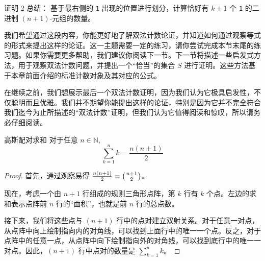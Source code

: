 \begin{questions}{证明 2 总结：}
    基于最右侧的 \verb|1| 出现的位置进行划分，计算恰好有 $k + 1$ 个 \verb|1| 的二进制 $(n+1)$-元组的数量。
\end{questions}

我们希望通过这段内容，你能更好地了解双法计数论证，并知道如何通过观察等式的形式来提出这样的论证。这一主题需要一定的练习，请你尝试完成本节末尾的练习题。如果你需要更多帮助，我们建议你阅读下一节。下一节将描述一些启发式方法，用于观察双法计数问题，并提出一个``恰当''的集合 $S$ 进行证明。这些方法基于本章前面介绍的标准计数对象及其对应的公式。

在继续之前，我们想展示最后一个双法计数证明，因为我们认为它极具启发性，不仅聪明而且优雅。我们并不期望你能提出这样的论证，特别是因为它并不完全符合我们迄今为止所描述的``双法计数''证明，但我们认为它值得阅读和惊叹，所以请务必仔细阅读。

\begin{proposition}{高斯配对求和}
    对于任意 $n \in \mathbb{N}$,
    \[\sum_{k=1}^{n} k = \frac{n(n+1)}{2}\]
\end{proposition}

\begin{proof}
    首先，通过观察易得 $\frac{n(n+1)}{2} = \big({n+1 \atop 2}\big)$。

    现在，考虑一个由 $n + 1$ 行组成的规则三角形点阵，第 $k$ 行有 $k$ 个点。左边的求和表示点阵前 $n$ 行的``面积''，也就是前 $n$ 行的总点数。

    接下来，我们将这些点与 $(n+1)$ 行中的点对建立双射关系。对于任意一对点，从点阵中向上绘制指向内的对角线，可以找到上面行中的唯一一个点。反之，对于点阵中的任意一点，从点阵中向下绘制指向外的对角线，可以找到底行中的唯一一对点。因此，$(n + 1)$ 行中点对的数量是 $\sum_{k=1}^n k$。
\end{proof}